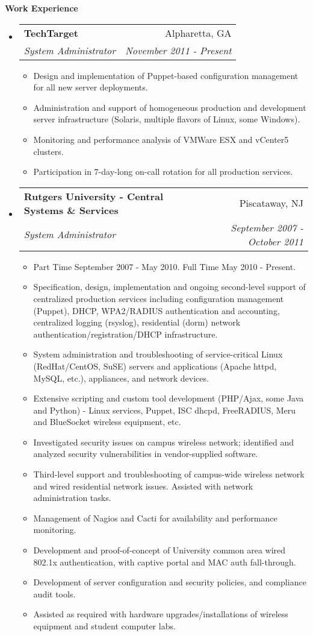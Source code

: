 \documentclass[letterpaper,11pt]{article}
\makeatletter
\newcommand{\resitem}[1]{\item #1 \vspace{-2pt}}
\newcommand{\resheading}[1]{{\large \colorbox{mygrey}{\begin{minipage}{\textwidth}{\textbf{#1 \vphantom{p\^{E}}}}\end{minipage}}}}
\newcommand{\ressubheading}[4]{
\begin{tabular*}{7.0in}{l@{\extracolsep{\fill}}r}
		\textbf{#1} & #2 \\
		\textit{#3} & \textit{#4} \\
\end{tabular*}\vspace{-6pt}}
\makeatother
\begin{document}
\resheading{Work Experience}
\begin{itemize}
\item
	\ressubheading{TechTarget}{Alpharetta, GA}{System Administrator}{November 2011 - Present}
	\begin{itemize}
		\resitem{Design and implementation of Puppet-based configuration management for all new server deployments.}
                \resitem{Administration and support of homogeneous production and development server infrastructure (Solaris, multiple flavors of Linux, some Windows).}
                \resitem{Monitoring and performance analysis of VMWare ESX and vCenter5 clusters.}
                \resitem{Participation in 7-day-long on-call rotation for all production services.}
	\end{itemize}

\item
	\ressubheading{Rutgers University - Central Systems \&
          Services}{Piscataway, NJ}{System Administrator}{September 2007 - October 2011}
	\begin{itemize}
                \resitem{Part Time September 2007 - May 2010. Full Time May 2010 - Present.}
                \resitem{Specification, design, implementation and ongoing second-level support of centralized production services including configuration management (Puppet), DHCP, WPA2/RADIUS authentication and accounting, centralized logging (rsyslog), residential (dorm) network authentication/registration/DHCP infrastructure.}
                \resitem{System administration and troubleshooting of
                  service-critical Linux (RedHat/CentOS, SuSE) servers and
                  applications (Apache httpd, MySQL, etc.), appliances, and network devices.}
                \resitem{Extensive scripting and custom tool development
                  (PHP/Ajax, some Java and Python)
                  - Linux services, Puppet, ISC dhcpd, FreeRADIUS, Meru and BlueSocket wireless equipment, etc.}
                \resitem{Investigated security issues on campus wireless network; identified and analyzed security vulnerabilities in vendor-supplied software.}
                \resitem{Third-level support and troubleshooting of campus-wide wireless network and wired residential network issues. Assisted with network administration tasks.}
                \resitem{Management of Nagios and Cacti for availability and performance monitoring.}
		\resitem{Development and proof-of-concept of University common area wired 802.1x authentication, with captive portal and MAC auth fall-through.}
		\resitem{Development of server configuration and security
                  policies, and compliance audit tools.}
                \resitem{Assisted as required with hardware upgrades/installations of wireless equipment and student computer labs.}
	\end{itemize}


\end{itemize}
\end{document}
